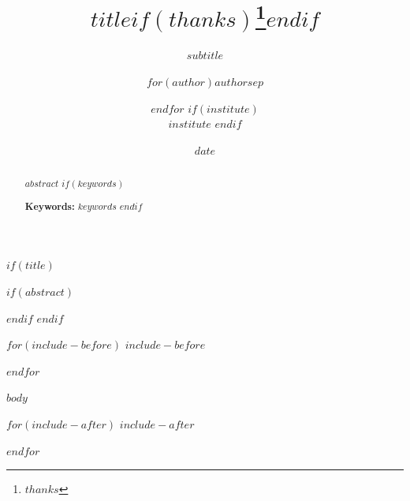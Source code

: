 \documentclass[11pt,a4paper]{article}
\title{$title$$if(thanks)$\thanks{$thanks$}$endif$}
\subtitle{$subtitle$}
\author{$for(author)$$author$$sep$ \and $endfor$
$if(institute)$
  \\ \normalsize $institute$
$endif$
}
\date{$date$}
\begin{document}
$if(title)$
\maketitle
$if(abstract)$
\begin{abstract}
$abstract$
$if(keywords)$

\textbf{Keywords:} $keywords$
$endif$
\end{abstract}
$endif$
$endif$

$for(include-before)$
$include-before$

$endfor$

$body$

$for(include-after)$
$include-after$

$endfor$
\end{document}
